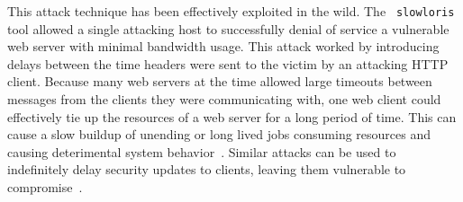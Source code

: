 This attack technique has been effectively exploited in the wild.  The {\tt 
slowloris} tool
allowed a single attacking host to successfully denial of service a vulnerable
web server with minimal bandwidth usage.  This attack worked by introducing
delays between the time headers were sent to the victim by an attacking HTTP
client.  Because many web servers at the time allowed large timeouts between
messages from the clients they were communicating with, one web client could
effectively tie up the resources of a web server for a long period of
time.
This can cause a slow buildup of unending or long
lived jobs consuming resources and causing deterimental system 
behavior~\cite{Slowloris}.  Similar attacks can be used to indefinitely 
delay security updates to clients, leaving them vulnerable to 
compromise~\cite{Cappos_TR_08}.



